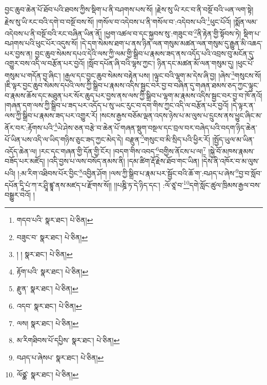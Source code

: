 བྱང་ཆུབ་ཆེན་པོ་ཐོབ་པའི་ཐབས་ཀྱིས་སྡིག་པ་ནི་བཤགས་པས་སོ། །རྗེས་སུ་ཡི་རང་བ་ནི་བསྔོ་བའི་ཡན་ལག་སྟེ། རྗེས་སུ་ཡི་རང་བའི་དགེ་བ་བསྔོ་བས་སོ། །གསོལ་བ་འདེབས་པ་ནི་གསོལ་བ་:འདེབས་པའི་\footnote{གདབ་པའི་  སྣར་ཐང་།  པེ་ཅིན། }ཕུང་པོའོ། །སྨོན་ལམ་འདེབས་པ་ནི་བསྔོ་བའི་རང་བཞིན་ཡིན་ནོ། །ཕྱག་འཚལ་བ་དང་སྐྱབས་སུ་:གཟུང་བ་\footnote{བཟུང་བ་  སྣར་ཐང་།  པེ་ཅིན། }ནི་རྟེན་གྱི་སྟོབས་ཏེ། སྡིག་པ་བཤགས་པའི་ཕུང་པོར་འདུས་སོ། །དེ་དག་སེམས་ཐག་པ་ནས་ཉིན་ལན་གསུམ་མཚན་ལན་གསུམ་དུ་རྒྱུན་མི་འཆད་པར་བྱས་ན། བྱང་ཆུབ་སེམས་དཔའ་དེའི་ལས་ཀྱི་ལམ་གྱི་སྒྲིབ་པ་རྣམས་ཟད་ནས་འདོད་པའི་འབྲས་བུ་མངོན་དུ་འགྱུར་བས་འདི་ལ་བརྩོན་པར་བྱའོ། །སློབ་དཔོན་ཞི་བའི་ལྷས་ཀྱང་། ཉིན་དང་མཚན་མོ་ལན་གསུམ་དུ། །ཕུང་པོ་གསུམ་པ་གདོན་བྱ་ཞིང་། །རྒྱལ་དང་བྱང་ཆུབ་སེམས་བརྟེན་པས། །ལྟུང་བའི་ལྷག་མ་དེས་ཞི་བྱ། །ཞེས་\footnote{། །  སྣར་ཐང་།  པེ་ཅིན། }གསུངས་སོ། །ཇི་ལྟར་བྱང་ཆུབ་སེམས་དཔའི་ལས་ཀྱི་སྒྲིབ་པ་རྣམས་འདིས་སྦྱང་བར་བྱ་བ་བཞིན་དུ་གཞན་ཐམས་ཅད་ཀྱང་ལྟུང་བ་རྣམས་ཆོས་དང་མཐུན་པར་སོར་ཆུད་པར་བྱས་ནས་ལས་ཀྱི་སྒྲིབ་པ་ལྷག་མ་རྣམས་འདིས་སྦྱང་བར་བྱ་བ་ཁོ་ནའོ། །གཞན་དག་ལས་ཀྱི་སྒྲིབ་པ་ཟད་པར་འདོད་པ་སུ་ཡང་རུང་བ་དག་གིས་ཀྱང་འདི་ལ་བརྩོན་པར་བྱའོ། །དེ་ལྟར་ན་ལས་ཀྱི་སྒྲིབ་པ་རྣམས་ཟད་པར་འགྱུར་རོ། །སངས་རྒྱས་བཅོམ་ལྡན་འདས་ཉེས་པ་མ་ལུས་པ་དྲུངས་ནས་ཕྱུང་ཞིང་མ་ནོར་བར་:རྟོགས་པའི་\footnote{རྟོག་པའི་  སྣར་ཐང་།  པེ་ཅིན། }ཡེ་ཤེས་ཅན་བརྩེ་བ་ཆེན་པོ་གཞན་སྡུག་བསྔལ་དང་བྲལ་བར་བཞེད་པའི་བདག་ཉིད་ཆེན་པོ་ཡིན་པས་འདི་ལ་ཡིད་གཉིས་ཅུང་ཟད་ཀྱང་མེད་དེ། བརྫུན་\footnote{རྫུན་  སྣར་ཐང་།  པེ་ཅིན། }གསུང་བ་མི་སྲིད་པའི་ཕྱིར་རོ། །སྤྱོད་ཡུལ་མ་ཡིན་འདོད་ཆེན་ལ། །རང་དང་གཞན་གྱི་དོན་གྱི་ངོར། །བདག་གིས་འབད་\footnote{འདབ་  སྣར་ཐང་།  པེ་ཅིན། }བགྱིས་ནོངས་པ་ལ།\footnote{ལས།  སྣར་ཐང་།  པེ་ཅིན། } །སྐྱེ་བོ་མཁས་རྣམས་བཟོད་པར་མཛོད། །འདི་བྱས་པ་ལས་བསོད་ནམས་ནི། །དམ་ཚིག་རྡོ་རྗེས་ཐོབ་གང་ཡིན། །དེས་ནི་འཁོར་བ་མ་ལུས་པའི། །:མ་རིག་འཐིབས་པོར་བྱིང་\footnote{མ་རིགཐིབས་པོ་དཔྱིས་  སྣར་ཐང་།  པེ་ཅིན། }འབྱིན་ཤོག །ལས་ཀྱི་སྒྲིབ་པ་རྣམ་པར་སྦྱོང་བའི་ཆོ་ག་:བཤད་པ་ཞེས་\footnote{བཤད་པ་ཞེསཔ་  སྣར་ཐང་།  པེ་ཅིན། }བྱ་བ་སློབ་དཔོན་དཱི་པཾ་ཀ་ར་ཤྲཱི་ཛྙཱ་ནས་མཛད་པ་རྫོགས་སོ།། །།པཎྜི་ཏ་དེ་ཉིད་དང་། :ལོ་ཙཱ་བ་\footnote{ལོཙྪ་  སྣར་ཐང་།  པེ་ཅིན། }དགེ་སློང་ཚུལ་ཁྲིམས་རྒྱལ་བས་བསྒྱུར་བའོ། ། 